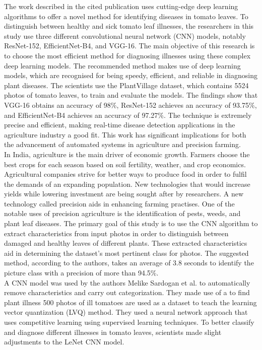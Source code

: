 \documentclass[conference]{IEEEtran}
\begin{document}
The work described in the \cite{10089689} cited publication uses cutting-edge deep learning algorithms to offer a novel method for identifying diseases in tomato leaves. To distinguish between healthy and sick tomato leaf illnesses, the researchers in this study use three different convolutional neural network (CNN) models, notably ResNet-152, EfficientNet-B4, and VGG-16. The main objective of this research is to choose the most efficient method for diagnosing illnesses using these complex deep learning models. The recommended method makes use of deep learning models, which are recognised for being speedy, efficient, and reliable in diagnosing plant diseases. The scientists use the PlantVillage dataset, which contains 5524 photos of tomato leaves, to train and evaluate the models. The findings show that VGG-16 obtains an accuracy of 98\%, ResNet-152 achieves an accuracy of 93.75\%, and EfficientNet-B4 achieves an accuracy of 97.27\%. The technique is extremely precise and efficient, making real-time disease detection applications in the agriculture industry a good fit. This work has significant implications for both the advancement of automated systems in agriculture and precision farming. \\

In India, agriculture is the main driver of economic growth. Farmers choose the best crops for each season based on soil fertility, weather, and crop economics. Agricultural companies strive for better ways to produce food in order to fulfil the demands of an expanding population. New technologies that would increase yields while lowering investment are being sought after by researchers. A new technology called precision aids in enhancing farming practises. One of the notable uses of precision agriculture is the identification of pests, weeds, and plant leaf diseases. \cite{deepalakshmi2021plant} The primary goal of this study is to use the CNN algorithm to extract characteristics from input photos in order to distinguish between damaged and healthy leaves of different plants. These extracted characteristics aid in determining the dataset's most pertinent class for photos. The suggested method, according to the authors, takes an average of 3.8 seconds to identify the picture class with a precision of more than 94.5\%.\\

A CNN model was used by the authors Melike Sardogan et al. \cite{8566635} to automatically remove characteristics and carry out categorization. They made use of a to find plant illness 500 photos of ill tomatoes are used as a dataset to teach the learning vector quantization (LVQ) method. They used a neural network approach that uses competitive learning using supervised learning techniques. To better classify and diagnose different illnesses in tomato leaves, scientists made slight adjustments to the LeNet CNN model.\\
\end{document}
